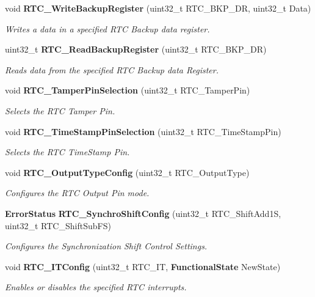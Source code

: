 \begin{DoxyCompactItemize}
void \textbf{ R\+T\+C\+\_\+\+Write\+Backup\+Register} (uint32\+\_\+t R\+T\+C\+\_\+\+B\+K\+P\+\_\+\+DR, uint32\+\_\+t Data)
\begin{DoxyCompactList}\small\item\em Writes a data in a specified R\+TC Backup data register. \end{DoxyCompactList}\item 
uint32\+\_\+t \textbf{ R\+T\+C\+\_\+\+Read\+Backup\+Register} (uint32\+\_\+t R\+T\+C\+\_\+\+B\+K\+P\+\_\+\+DR)
\begin{DoxyCompactList}\small\item\em Reads data from the specified R\+TC Backup data Register. \end{DoxyCompactList}\item 
void \textbf{ R\+T\+C\+\_\+\+Tamper\+Pin\+Selection} (uint32\+\_\+t R\+T\+C\+\_\+\+Tamper\+Pin)
\begin{DoxyCompactList}\small\item\em Selects the R\+TC Tamper Pin. \end{DoxyCompactList}\item 
void \textbf{ R\+T\+C\+\_\+\+Time\+Stamp\+Pin\+Selection} (uint32\+\_\+t R\+T\+C\+\_\+\+Time\+Stamp\+Pin)
\begin{DoxyCompactList}\small\item\em Selects the R\+TC Time\+Stamp Pin. \end{DoxyCompactList}\item 
void \textbf{ R\+T\+C\+\_\+\+Output\+Type\+Config} (uint32\+\_\+t R\+T\+C\+\_\+\+Output\+Type)
\begin{DoxyCompactList}\small\item\em Configures the R\+TC Output Pin mode. \end{DoxyCompactList}\item 
\textbf{ Error\+Status} \textbf{ R\+T\+C\+\_\+\+Synchro\+Shift\+Config} (uint32\+\_\+t R\+T\+C\+\_\+\+Shift\+Add1S, uint32\+\_\+t R\+T\+C\+\_\+\+Shift\+Sub\+FS)
\begin{DoxyCompactList}\small\item\em Configures the Synchronization Shift Control Settings. \end{DoxyCompactList}\item 
void \textbf{ R\+T\+C\+\_\+\+I\+T\+Config} (uint32\+\_\+t R\+T\+C\+\_\+\+IT, \textbf{ Functional\+State} New\+State)
\begin{DoxyCompactList}\small\item\em Enables or disables the specified R\+TC interrupts. \end{DoxyCompactList}\item 

\end{DoxyCompactItemize}
